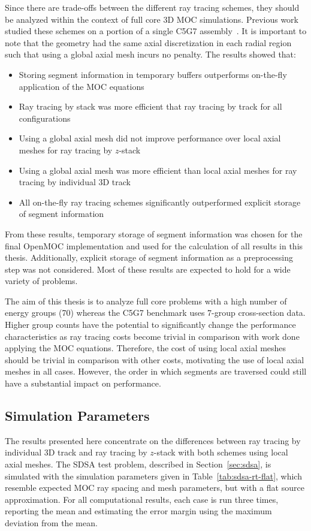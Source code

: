 Since there are trade-offs between the different ray tracing schemes, they should be analyzed within the context of full core 3D \ac{MOC} simulations. Previous work studied these schemes on a portion of a single C5G7 assembly~\cite{physor2016otf}. It is important to note that the geometry had the same axial discretization in each radial region such that using a global axial mesh incurs no penalty. The results showed that:
\begin{itemize}
	\item Storing segment information in temporary buffers outperforms on-the-fly application of the \ac{MOC} equations
	\item Ray tracing by stack was more efficient that ray tracing by track for all configurations
	\item Using a global axial mesh did not improve performance over local axial meshes for ray tracing by $z$-stack
	\item Using a global axial mesh was more efficient than local axial meshes for ray tracing by individual 3D track
	\item All on-the-fly ray tracing schemes significantly outperformed explicit storage of segment information
\end{itemize}

From these results, temporary storage of segment information was chosen for the final OpenMOC implementation and used for the calculation of all results in this thesis. Additionally, explicit storage of segment information as a preprocessing step was not considered. Most of these results are expected to hold for a wide variety of problems.

The aim of this thesis is to analyze full core problems with a high number of energy groups (70) whereas the C5G7 benchmark uses 7-group cross-section data. Higher group counts have the potential to significantly change the performance characteristics as ray tracing costs become trivial in comparison with work done applying the \ac{MOC} equations. Therefore, the cost of using local axial meshes should be trivial in comparison with other costs, motivating the use of local axial meshes in all cases. However, the order in which segments are traversed could still have a substantial impact on performance. 

\subsection{Simulation Parameters}

The results presented here concentrate on the differences between ray tracing by individual 3D track and ray tracing by $z$-stack with both schemes using local axial meshes. The SDSA test problem, described in Section~\ref{sec:sdsa}, is simulated with the simulation parameters given in Table~\ref{tab:sdsa-rt-flat}, which resemble expected \ac{MOC} ray spacing and mesh parameters, but with a flat source approximation. For all computational results, each case is run three times, reporting the mean and estimating the error margin using the maximum deviation from the mean.
	
